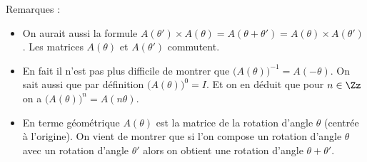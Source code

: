 {{Remarques :
\begin{itemize}
  \item On aurait aussi la formule $A(\theta')\times A(\theta) = A(\theta+\theta') = A(\theta)\times A(\theta')$.
Les matrices $A(\theta)$ et $A(\theta')$ commutent.

  \item En fait il n'est pas plus difficile de montrer que $\big(A(\theta)\big)^{-1}=A(-\theta)$.
On sait aussi que par définition $\big(A(\theta)\big)^{0}=I$. Et on en déduit que pour $n\in \Zz$ on a 
$\big(A(\theta)\big)^n = A(n\theta)$.

  \item En terme géométrique $A(\theta)$ est la matrice de la rotation d'angle $\theta$ (centrée à l'origine).
On vient de montrer que si l'on compose un rotation d'angle $\theta$ avec un rotation d'angle $\theta'$
alors on obtient une rotation d'angle $\theta+\theta'$.
\end{itemize}
}
}
